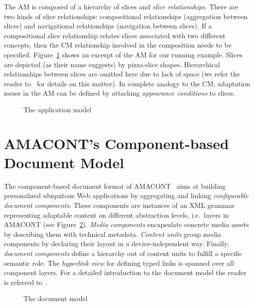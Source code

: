 \documentclass[oribibl]{llncs}
\begin{document}
The AM is composed of a hierarchy of slices and \emph{slice relationships}.
There are two kinds of slice relationships: compositional relationships
(aggregation between slices) and navigational relationships (navigation
between slices). 
If a compositional slice relationship relates slices associated with two different concepts, then the CM relationship involved in the composition needs to be specified. 
Figure~\ref{fig:am} shows an excerpt of the AM for our running example.
Slices are depicted (as their name suggests) by pizza-slice shapes.
Hierarchical relationships between slices are omitted here due to lack of
space (we refer the reader to~\cite{hera:itcc} for details on this
matter). 
In complete analogy to the CM, adaptation issues in the AM can be defined by 
attaching \emph{appearance conditions} to slices.

\begin{figure}[h]
\centering
{}
\caption{The application model}
\label{fig:am}
\end{figure}

\section{AMACONT's Component-based Document Model}
\label{amacont}

The component-based document format of AMACONT~\cite{amacont:jwe} aims at building personalized ubiquitous Web applications by aggregating and linking \emph{configurable document components}. 
These components are instances of an XML grammar representing adaptable content on different abstraction levels, i.e.\ layers in AMACONT (see Figure~\ref{docmod}).
\emph{Media components} encapsulate concrete media assets by describing them with technical metadata. 
\emph{Content units} group media components by declaring their layout in a device-independent way. 
Finally, \emph{document components} define a hierarchy out of content units to fulfill a specific semantic role. 
The \emph{hyperlink view} for defining typed links is spanned over all component layers.
For a detailed introduction to the document model the reader is referred to~\cite{amacont:jwe}.

\begin{figure}[h]
\centering
{}
\caption{The document model}
\label{docmod}
\end{figure}
\end{document}
